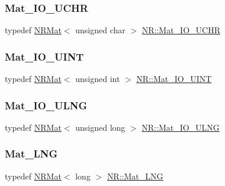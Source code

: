 \mbox{\label{namespaceNR_af70383f9e6e29193c2f46b4fa917222f}} 
\subsubsection{\texorpdfstring{Mat\_IO\_UCHR}{Mat\_IO\_UCHR}}
{\footnotesize\ttfamily typedef \mbox{\hyperlink{classNR_1_1NRMat}{N\+R\+Mat}}$<$ unsigned char $>$ \mbox{\hyperlink{namespaceNR_af70383f9e6e29193c2f46b4fa917222f}{N\+R\+::\+Mat\+\_\+\+I\+O\+\_\+\+U\+C\+HR}}}

\mbox{\label{namespaceNR_aa00c34c0788f7a1ac5f7d7969e4f3cd8}} 
\subsubsection{\texorpdfstring{Mat\_IO\_UINT}{Mat\_IO\_UINT}}
{\footnotesize\ttfamily typedef \mbox{\hyperlink{classNR_1_1NRMat}{N\+R\+Mat}}$<$ unsigned int $>$ \mbox{\hyperlink{namespaceNR_aa00c34c0788f7a1ac5f7d7969e4f3cd8}{N\+R\+::\+Mat\+\_\+\+I\+O\+\_\+\+U\+I\+NT}}}

\mbox{\label{namespaceNR_ad39bb0df7e57ea005a5334cc659f5743}} 
\subsubsection{\texorpdfstring{Mat\_IO\_ULNG}{Mat\_IO\_ULNG}}
{\footnotesize\ttfamily typedef \mbox{\hyperlink{classNR_1_1NRMat}{N\+R\+Mat}}$<$ unsigned long $>$ \mbox{\hyperlink{namespaceNR_ad39bb0df7e57ea005a5334cc659f5743}{N\+R\+::\+Mat\+\_\+\+I\+O\+\_\+\+U\+L\+NG}}}

\mbox{\label{namespaceNR_ac504afbbcf367d0268a82fb2d9944ff5}} 
\subsubsection{\texorpdfstring{Mat\_LNG}{Mat\_LNG}}
{\footnotesize\ttfamily typedef \mbox{\hyperlink{classNR_1_1NRMat}{N\+R\+Mat}}$<$ long $>$ \mbox{\hyperlink{namespaceNR_ac504afbbcf367d0268a82fb2d9944ff5}{N\+R\+::\+Mat\+\_\+\+L\+NG}}}

